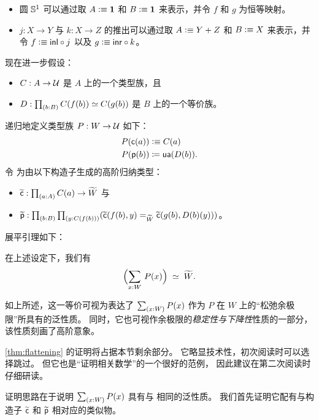 \begin{itemize}
\item 圆 $\mathbb{S}^1$ 可以通过取 $A\vcentcolon\equiv \mathbf{1}$ 和 $B\vcentcolon\equiv \mathbf{1}$ 来表示，并令 $f$ 和 $g$ 为恒等映射。
\item $j:X\to Y$ 与 $k:X\to Z$ 的推出可以通过取 $A\vcentcolon\equiv Y+Z$ 和 $B\vcentcolon\equiv X$ 来表示，并令 $f\vcentcolon\equiv {\mathsf{inl}} \circ j$ 以及 $g\vcentcolon\equiv {\mathsf{inr}}\circ k$。
\end{itemize}


现在进一步假设：

\begin{itemize}
\item $C:A\to\mathcal{U}$ 是 $A$ 上的一个类型族，且
\item $D:\prd{b:B}\eqv{C(f(b))}{C(g(b))}$ 是 $B$ 上的一个等价族。
\end{itemize}


递归地定义类型族 $P : W\to\mathcal{U}$ 如下：
\begin{align*}
  P(\mathsf{c}(a)) &\vcentcolon\equiv C(a)\\
  {P}\mathopen{}\left({\mathsf{p}(b)}\right)\mathclose{} &\coloneqq \mathsf{ua}(D(b)).
\end{align*}
令 \Wtil 为由以下构造子生成的高阶归纳类型：

\begin{itemize}
\item $\cct:\prd{a:A} C(a) \to \Wtil$ 与
\item $\ppt:\prd{b:B}{y:C(f(b))} (\cct(f(b),y)=_{\Wtil}\cct(g(b),D(b)(y)))$。
\end{itemize}

展平引理如下：

\begin{lem}[展平引理]\label{thm:flattening}
  在上述设定下，我们有
  \[ \eqvspaced{\Parens{\sm{x:W} P(x)}}{\widetilde{W}}. \]
\end{lem}

%
如上所述，这一等价可视为表达了 $\sm{x:W} P(x)$ 作为 $P$ 在 $W$ 上的``松弛余极限''所具有的泛性质。
同时，它也可视作余极限的\emph{稳定性与下降性}性质的一部分，该性质刻画了高阶意象。%
%
%

\cref{thm:flattening} 的证明将占据本节剩余部分。
它略显技术性，初次阅读时可以选择跳过。
但它也是``证明相关数学''的一个很好的范例，
%
因此建议在第二次阅读时仔细研读。

证明思路在于说明 $\sm{x:W} P(x)$ 具有与 \Wtil 相同的泛性质。
我们首先证明它配有与构造子 $\widetilde{\mathsf{c}}$ 和 $\widetilde{\mathsf{p}}$ 相对应的类似物。

